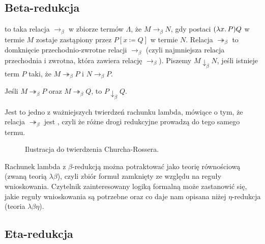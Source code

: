 \documentclass[polish,pretty]{angav}
\newcommand{\toto}{\twoheadrightarrow}
\begin{document}
\subsection{Beta-redukcja}

 to taka relacja $\to_\beta$ w zbiorze termów $\Lambda$, że $M \to_\beta N$, gdy  postaci $(\lambda x\ldotp P)Q$ w termie $M$ zostaje zastąpiony przez $P[x \coloneqq Q]$ w termie $N$.
Relacja $\toto_\beta$ to domknięcie przechodnio-zwrotne relacji $\to_\beta$ (czyli najmniejsza relacja przechodnia i zwrotna, która zawiera relację $\to_\beta$).
Piszemy $M \downarrow_\beta N$, jeśli istnieje term $P$ taki, że $M \toto_\beta P$ i $N \to_\beta P$.

\begin{theorem}
    Jeśli $M \toto_\beta P$ oraz $M \toto_\beta Q$, to $P \downarrow_\beta Q$.
\end{theorem}

Jest to jedno z ważniejszych twierdzeń rachunku lambda, mówiące o tym, że relacja $\toto_\beta$ jest , czyli że różne drogi redukcyjne prowadzą do tego samego termu.

\begin{figure}[H]
    \centering
    \caption{Ilustracja do twierdzenia Churcha-Rossera.}
    \label{fig:church-rosser}
\end{figure}

\begin{remark}
    Rachunek lambda z $\beta$-redukcją można potraktować jako teorię równościową (zwaną teorią $\lambda\beta$), czyli zbiór formuł zamknięty ze względu na reguły wnioskowania. Czytelnik zainteresowany logiką formalną może zastanowić się, jakie reguły wnioskowania są potrzebne oraz co daje nam opisana niżej $\eta$-redukcja (teoria $\lambda\beta\eta$).
\end{remark}

\subsection{Eta-redukcja}
\end{document}
